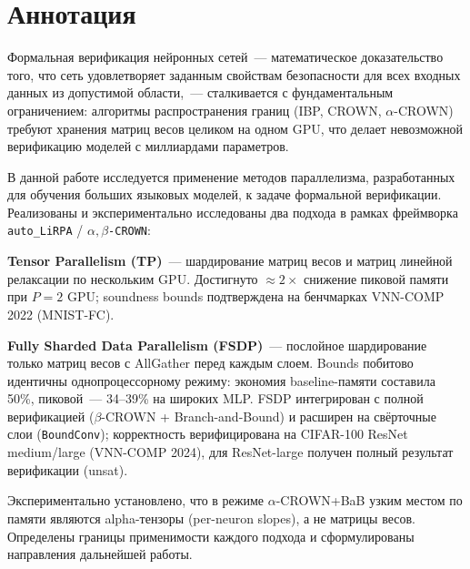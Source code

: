 \section*{Аннотация}

Формальная верификация нейронных сетей~--- математическое доказательство
того, что сеть удовлетворяет заданным свойствам безопасности для всех
входных данных из допустимой области,~--- сталкивается с фундаментальным
ограничением: алгоритмы распространения границ (IBP, CROWN,
$\alpha$-CROWN) требуют хранения матриц весов целиком на одном GPU,
что делает невозможной верификацию моделей с миллиардами параметров.

В данной работе исследуется применение методов параллелизма, разработанных
для обучения больших языковых моделей, к задаче формальной верификации.
Реализованы и экспериментально исследованы два подхода в рамках
фреймворка \texttt{auto\_LiRPA} / \texttt{$\alpha,\beta$-CROWN}:

\textbf{Tensor Parallelism (TP)}~--- шардирование матриц весов и
матриц линейной релаксации по нескольким GPU. Достигнуто $\approx\!2\times$
снижение пиковой памяти при $P=2$ GPU; soundness bounds подтверждена
на бенчмарках VNN-COMP 2022 (MNIST-FC).

\textbf{Fully Sharded Data Parallelism (FSDP)}~--- послойное шардирование
только матриц весов с AllGather перед каждым слоем. Bounds побитово
идентичны однопроцессорному режиму: экономия baseline-памяти составила
50\%, пиковой~--- 34--39\% на широких MLP. FSDP интегрирован
с полной верификацией ($\beta$-CROWN + Branch-and-Bound) и расширен
на свёрточные слои (\texttt{BoundConv}); корректность верифицирована
на CIFAR-100 ResNet medium/large (VNN-COMP 2024), для ResNet-large
получен полный результат верификации (unsat).

Экспериментально установлено, что в режиме $\alpha$-CROWN+BaB узким
местом по памяти являются alpha-тензоры (per-neuron slopes),
а не матрицы весов. Определены границы применимости каждого подхода
и сформулированы направления дальнейшей работы.

